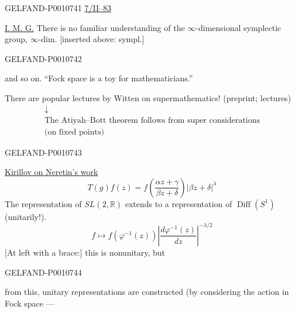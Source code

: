 \begin{GelfandAdjacentEvidence}{GELFAND-P001074}{1}
\uline{7/II–83}


\uline{I. M. G.} There is no familiar understanding of the $\infty$-dimensional symplectic group,
$\infty$-dim. [inserted above: sympl.]
\end{GelfandAdjacentEvidence}
\begin{GelfandAdjacentEvidence}{GELFAND-P001074}{2}

and so on. “Fock space is a toy for mathematicians.”

There are popular lectures by Witten on supermathematics! (preprint; lectures)
\begin{equation*}
\begin{gathered}
\downarrow\\
\text{The Atiyah–Bott theorem follows from super considerations}\\
\text{(on fixed points)}
\end{gathered}
\end{equation*}
\end{GelfandAdjacentEvidence}
\begin{GelfandAdjacentEvidence}{GELFAND-P001074}{3}


\uline{Kirillov on Neretin’s work}
\begin{equation*}
T(g)f(z)=f\left(\frac{\alpha z+\gamma}{\beta z+\delta}\right)
|\beta z+\delta|^\lambda
\end{equation*}
The representation of $SL(2,\mathbb R)$ extends to a representation of $\operatorname{Diff}(S^1)$ (unitarily!).
\begin{equation*}
f\longmapsto f(\varphi^{-1}(z))
\left|\frac{d\varphi^{-1}(z)}{dz}\right|^{-\lambda/2}
\end{equation*}
[At left with a brace:] this is nonunitary, but
\end{GelfandAdjacentEvidence}
\begin{GelfandAdjacentEvidence}{GELFAND-P001074}{4}

from this, unitary representations are constructed (by considering the action in Fock space —
\end{GelfandAdjacentEvidence}

